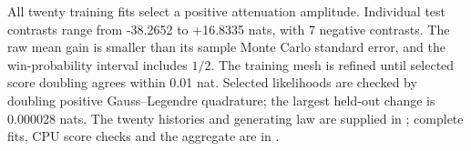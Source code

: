 All twenty training fits select a positive attenuation amplitude. Individual test contrasts range from -38.2652 to +16.8335 nats, with 7 negative contrasts. The raw mean gain is smaller than its sample Monte Carlo standard error, and the win-probability interval includes $1/2$. The training mesh is refined until selected score doubling agrees within 0.01 nat. Selected likelihoods are checked by doubling positive Gauss--Legendre quadrature; the largest held-out change is 0.000028 nats. The twenty histories and generating law are supplied in ; complete fits, CPU score checks and the aggregate are in .

